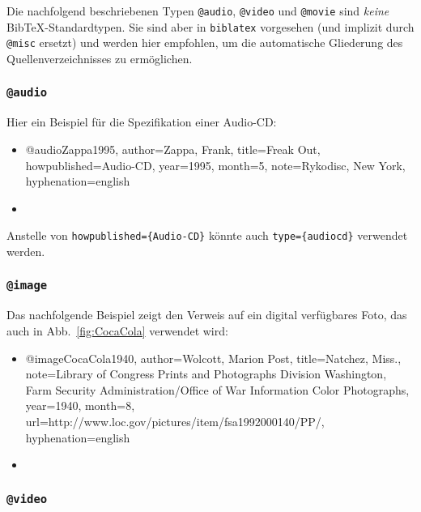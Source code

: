 Die nachfolgend beschriebenen Typen \texttt{@audio}, \texttt{@video} und \texttt{@movie} 
sind \emph{keine} Bib\-TeX-Standardtypen. Sie sind aber in \texttt{biblatex} vorgesehen
(und implizit durch \texttt{@misc} ersetzt) und werden hier empfohlen, um die automatische 
Gliederung des Quellenverzeichnisses zu ermöglichen.


\subsubsection{\texttt{@audio}}
\label{sec:@audio}
Hier ein Beispiel für die Spezifikation einer Audio-CD:
%
\begin{itemize}
\item[] 
\begin{GenericCode}[numbers=none]
@audio{Zappa1995,
  author={Zappa, Frank},
  title={Freak Out},
  howpublished={Audio-CD},
  year={1995},
  month={5},
  note={Rykodisc, New York},
  hyphenation={english}
}
\end{GenericCode}
\item[\cite{Zappa1995}] 
\end{itemize}
%
Anstelle von \verb!howpublished={Audio-CD}! könnte auch \verb!type={audiocd}! verwendet werden.


\subsubsection{\texttt{@image}}
\label{sec:@image}

Das nachfolgende Beispiel zeigt den Verweis auf ein digital verfügbares Foto,
das auch in Abb.\ \ref{fig:CocaCola} verwendet wird:
%
\begin{itemize}
\item[] 
\begin{GenericCode}[numbers=none]
@image{CocaCola1940,
  author={Wolcott, Marion Post},
	title={Natchez, Miss.},
	note={Library of Congress Prints and Photographs Division Washington, Farm Security Administration/Office of War Information Color Photographs},
	year={1940},
	month={8},
	url={http://www.loc.gov/pictures/item/fsa1992000140/PP/},
  hyphenation={english}
 }
\end{GenericCode}
\item[\cite{CocaCola1940}] 
\end{itemize}





\subsubsection{\texttt{@video}}
\label{sec:@video}


